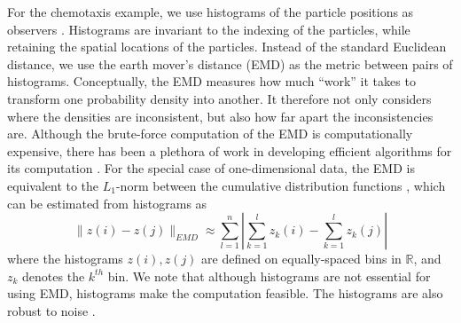 \documentclass[preprint]{elsarticle}
\begin{document}
For the chemotaxis example, we use histograms of the particle positions as observers \cite{talmon2013empirical}. 
%
Histograms are invariant to the indexing of the particles, while retaining the spatial locations of the particles.
%
Instead of the standard Euclidean distance, we use the earth mover's distance (EMD) \cite{rubner2000earth} as the metric between pairs of histograms. 
%
Conceptually, the EMD measures how much ``work'' it takes to transform one probability density into another.
%
It therefore not only considers where the densities are inconsistent, but also how far apart the inconsistencies are.
%
Although the brute-force computation of the EMD is computationally expensive, there has been a plethora of work in developing efficient algorithms for its computation \cite{Pele-eccv2008, Pele-iccv2009}.
%
For the special case of one-dimensional data, the EMD is equivalent to the $L_1$-norm between the cumulative distribution functions \cite{rubner2000perceptual}, which can be estimated from histograms as
\begin{equation}
\| z(i) - z(j) \|_{EMD} \approx \sum_{l=1}^{n} \left| \sum_{k=1}^l z_k(i) - \sum_{k=1}^l z_k(j) \right|
\end{equation}
where the histograms $z(i), z(j)$ are defined on equally-spaced bins in $\mathbb{R}$, and $z_k$ denotes the $k^{th}$ bin. 
%
We note that although histograms are not essential for using EMD, histograms make the computation feasible. 
%
The histograms are also robust to noise \cite{talmon2013empirical}. 
\end{document}
